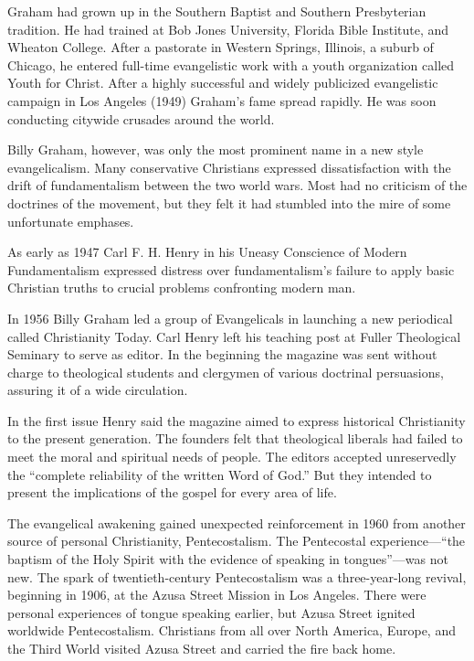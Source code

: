 Graham had grown up in the Southern Baptist and Southern Presbyterian tradition. He had trained at
Bob Jones University, Florida Bible Institute, and Wheaton College. After a pastorate in Western
Springs, Illinois, a suburb of Chicago, he entered full-time evangelistic work with a youth
organization called Youth for Christ. After a highly successful and widely publicized evangelistic
campaign in Los Angeles (1949) Graham’s fame spread rapidly. He was soon conducting citywide
crusades around the world.

Billy Graham, however, was only the most prominent name in a new style evangelicalism. Many
conservative Christians expressed dissatisfaction with the drift of fundamentalism between the two
world wars. Most had no criticism of the doctrines of the movement, but they felt it had stumbled
into the mire of some unfortunate emphases.

As early as 1947 Carl F. H. Henry in his Uneasy Conscience of Modern Fundamentalism expressed
distress over fundamentalism’s failure to apply basic Christian truths to crucial problems
confronting modern man.

In 1956 Billy Graham led a group of Evangelicals in launching a new periodical called Christianity
Today. Carl Henry left his teaching post at Fuller Theological Seminary to serve as editor. In the
beginning the magazine was sent without charge to theological students and clergymen of various
doctrinal persuasions, assuring it of a wide circulation.

In the first issue Henry said the magazine aimed to express historical Christianity to the present
generation. The founders felt that theological liberals had failed to meet the moral and spiritual
needs of people. The editors accepted unreservedly the “complete reliability of the written Word of
God.” But they intended to present the implications of the gospel for every area of life.

The evangelical awakening gained unexpected reinforcement in 1960 from another source of personal
Christianity, Pentecostalism. The Pentecostal experience—“the baptism of the Holy Spirit with the
evidence of speaking in tongues”—was not new. The spark of twentieth-century Pentecostalism was a
three-year-long revival, beginning in 1906, at the Azusa Street Mission in Los Angeles. There were
personal experiences of tongue speaking earlier, but Azusa Street ignited worldwide Pentecostalism.
Christians from all over North America, Europe, and the Third World visited Azusa Street and carried
the fire back home.

